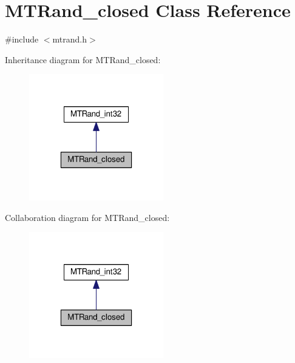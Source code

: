 \hypertarget{a00018}{\section{M\-T\-Rand\-\_\-closed Class Reference}
\label{a00018}
}


{\ttfamily \#include $<$mtrand.\-h$>$}



Inheritance diagram for M\-T\-Rand\-\_\-closed\-:\nopagebreak
\begin{figure}[H]
\begin{center}
\leavevmode
\includegraphics[width=166pt]{a00103}
\end{center}
\end{figure}


Collaboration diagram for M\-T\-Rand\-\_\-closed\-:\nopagebreak
\begin{figure}[H]
\begin{center}
\leavevmode
\includegraphics[width=166pt]{a00104}
\end{center}
\end{figure}
